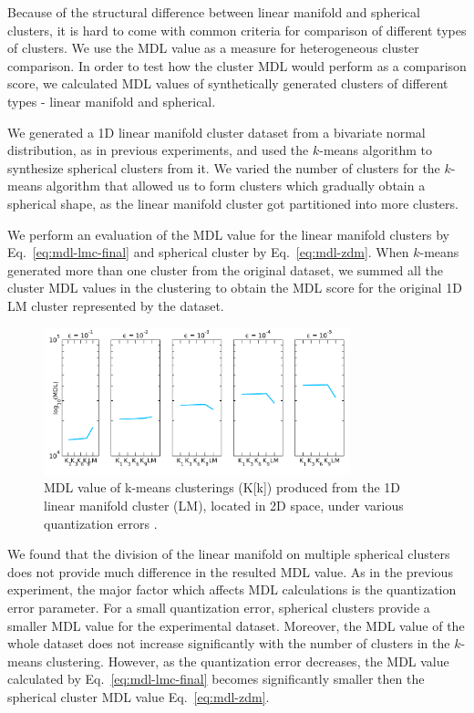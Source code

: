 
Because of the structural difference between linear manifold and spherical
clusters, it is hard to come with common criteria for comparison of
different types of clusters. We use the MDL value as a measure for
heterogeneous cluster comparison. In order to test how the cluster MDL would
perform as a comparison score, we calculated MDL values of synthetically
generated clusters of different types - linear manifold and spherical.

We generated a 1D linear manifold cluster dataset from a bivariate normal
distribution, as in previous experiments, and used the $k$-means algorithm to
synthesize spherical clusters from it. We varied the number of clusters for
the $k$-means algorithm that allowed us to form clusters which gradually
obtain a spherical shape, as the linear manifold cluster got partitioned
into more clusters.

We perform an evaluation of the MDL value for the linear manifold clusters by
Eq.~\eqref{eq:mdl-lmc-final} and spherical cluster by Eq.~\eqref{eq:mdl-zdm}.
When $k$-means generated more than one cluster from the original dataset,
we summed all the cluster MDL values in the clustering to obtain
the MDL score for the original 1D LM cluster represented by the dataset.

\begin{figure}[ht]
\center
\includegraphics[width=3.5in]{img/zero-dim-mdl_zdc-mdl-exp2_1.pdf}
\caption{MDL value of k-means clusterings (K[k]) produced from the 1D linear manifold cluster (LM), located in 2D space, under various quantization errors \textepsilon.}
\label{fig:zdc-mdl-exp2}
\end{figure}



We found that the division of
the linear manifold on multiple spherical clusters does not provide much
difference in the resulted MDL value. As in the previous experiment, the major
factor which affects MDL calculations is the quantization error parameter.
For a small quantization error, spherical clusters provide a smaller MDL value
for the experimental dataset. Moreover, the MDL value of the whole dataset does not
increase significantly with the number of clusters in the $k$-means clustering.
However, as the quantization error decreases, the MDL value calculated by
Eq.~\eqref{eq:mdl-lmc-final} becomes significantly smaller then the spherical
cluster MDL value Eq.~\eqref{eq:mdl-zdm}.

